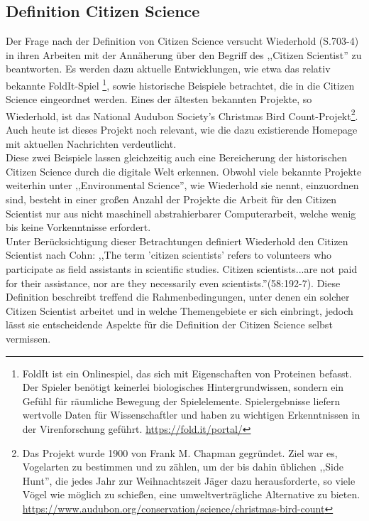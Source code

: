 \documentclass{article}
\begin{document}
\subsection{Definition Citizen Science}
Der Frage nach der Definition von Citizen Science versucht Wiederhold\cite{Wiederhold} (S.703-4) in ihren Arbeiten mit der Annäherung über den Begriff des ,,Citizen Scientist'' zu beantworten.
Es werden dazu aktuelle Entwicklungen, wie etwa das relativ bekannte FoldIt-Spiel \footnote{
FoldIt ist ein Onlinespiel, das sich mit Eigenschaften von Proteinen befasst. Der Spieler benötigt keinerlei biologisches Hintergrundwissen, sondern ein Gefühl für räumliche Bewegung der Spielelemente. Spielergebnisse liefern wertvolle Daten für Wissenschaftler und haben zu wichtigen Erkenntnissen in der Virenforschung geführt. \url{https://fold.it/portal/}}, 
sowie historische Beispiele betrachtet, die in die Citizen Science eingeordnet werden.
Eines der ältesten bekannten Projekte, so Wiederhold, ist das National Audubon Society's Christmas Bird Count-Projekt\footnote{Das Projekt wurde 1900 von Frank M. Chapman gegründet.
Ziel war es, Vogelarten zu bestimmen und zu zählen, um der bis dahin üblichen ,,Side Hunt'',
die jedes Jahr zur Weihnachtszeit Jäger dazu herausforderte, so viele Vögel wie möglich zu schießen,
eine umweltverträgliche Alternative zu bieten. \url{https://www.audubon.org/conservation/science/christmas-bird-count}}.
Auch heute ist dieses Projekt noch relevant, wie die dazu existierende Homepage mit aktuellen Nachrichten verdeutlicht.\\
Diese zwei Beispiele lassen gleichzeitig auch eine Bereicherung der historischen Citizen Science durch die digitale Welt erkennen.
Obwohl viele bekannte Projekte weiterhin unter ,,Environmental Science'', wie Wiederhold sie nennt, einzuordnen sind,
besteht in einer großen Anzahl der Projekte die Arbeit für den Citizen Scientist nur aus nicht maschinell abstrahierbarer Computerarbeit,
welche wenig bis keine Vorkenntnisse erfordert.\\
Unter Berücksichtigung dieser Betrachtungen definiert Wiederhold den Citizen Scientist nach Cohn\cite{Cohn}: 
,,The term 'citizen scientists' refers to volunteers who participate as field assistants in scientific studies.
Citizen scientists...are not paid for their assistance, nor are they necessarily even scientists.''(58:192-7).
Diese Definition beschreibt treffend die Rahmenbedingungen, unter denen ein solcher Citizen Scientist arbeitet 
und in welche Themengebiete er sich einbringt, jedoch lässt sie entscheidende Aspekte für die Definition der Citizen Science selbst vermissen.\\
\end{document}
